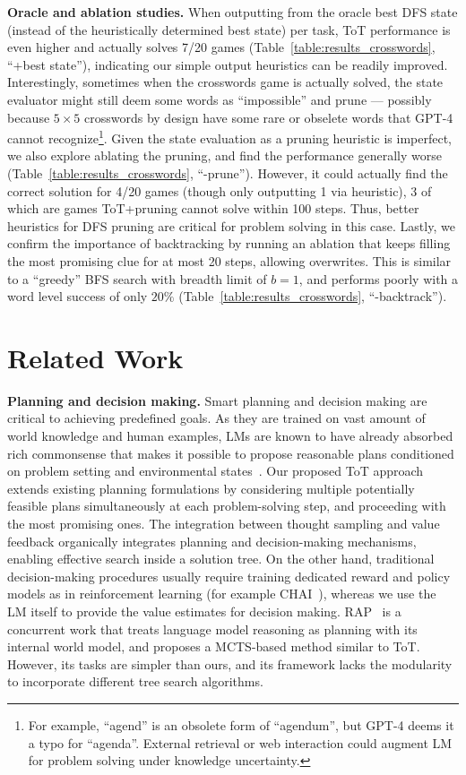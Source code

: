 \textbf{Oracle and ablation studies.} When outputting from the oracle best DFS state (instead of the heuristically determined best state) per task, ToT performance is even higher and actually solves 7/20 games (Table~\ref{table:results_crosswords}, ``+best state''), indicating our simple output heuristics can be readily improved. Interestingly, sometimes when the crosswords game is actually solved, the state evaluator might still deem some words as ``impossible'' and prune --- possibly because $5 \times 5$ crosswords by design have some rare or obselete words that GPT-4 cannot recognize\footnote{For example, ``agend'' is an obsolete form of ``agendum'', but GPT-4 deems it a typo for ``agenda''. External retrieval or web interaction could augment LM for problem solving under knowledge uncertainty.}. Given the state evaluation as a pruning heuristic is imperfect, we also explore ablating the pruning, and find the performance generally worse (Table~\ref{table:results_crosswords}, ``-prune''). However, it could actually find the correct solution for 4/20 games (though only outputting 1 via heuristic), 3 of which are games ToT+pruning cannot solve within 100 steps. Thus, better heuristics for DFS pruning are critical for problem solving in this case. Lastly, we confirm the importance of backtracking by running an ablation that keeps filling the most promising clue for at most 20 steps, allowing overwrites. This is similar to a ``greedy'' BFS search with breadth limit of $b=1$, and performs poorly with a word level success of only $20\%$ (Table~\ref{table:results_crosswords}, ``-backtrack''). 

\section{Related Work}

\textbf{Planning and decision making.} Smart planning and decision making are critical to achieving predefined goals. As they are trained on vast amount of world knowledge and human examples, LMs are known to have already absorbed rich commonsense that makes it possible to propose reasonable plans conditioned on problem setting and environmental states~\citep{huang2022language,zhang2023planning,wang2023describe,inner2022huang,wang2023planandsolve,yao2022react,yang2023foundation}. Our proposed ToT approach extends existing planning formulations by considering multiple potentially feasible plans simultaneously at each problem-solving step, and proceeding with the most promising ones. The integration between thought sampling and value feedback organically integrates planning and decision-making mechanisms, enabling effective search inside a solution tree. On the other hand, traditional decision-making procedures usually require training dedicated reward and policy models as in reinforcement learning (for example CHAI~\citep{verma2022chai}), whereas we use the LM itself to provide the value estimates for decision making. RAP~\citep{hao2023reasoning} is a concurrent work that treats language model reasoning as planning with its internal world model, and proposes a MCTS-based method similar to ToT. However, its tasks are simpler than ours, and its framework lacks the modularity to incorporate different tree search algorithms.

